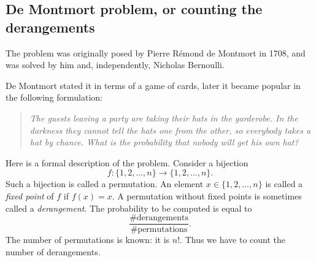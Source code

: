 \subsection{De Montmort problem, or counting the derangements}
The problem was originally posed by Pierre R\'emond de Montmort in 1708, and was solved by him and, independently, Nicholas Bernoulli.

De Montmort stated it in terms of a game of cards, later it became popular in the following formulation:

\begin{quote}
\emph{The guests leaving a party are taking their hats in the garderobe.
In the darkness they cannot tell the hats one from the other, so everybody takes a hat by chance.
What is the probability that nobody will get his own hat?}
\end{quote}

Here is a formal description of the problem.
Consider a bijection
\[
f \colon \{1, 2, \ldots, n\} \to \{1, 2, \ldots, n\}.
\]
Such a bijection is called a permutation.
An element $x \in \{1, 2, \ldots, n\}$ is called a \emph{fixed point} of $f$ if $f(x) = x$.
A permutation without fixed points is sometimes called a \emph{derangement}.
The probability to be computed is equal to
\[
\frac{\#\text{derangements}}{\#\text{permutations}}.
\]
The number of permutations is known: it is $n!$.
Thus we have to count the number of derangements.

